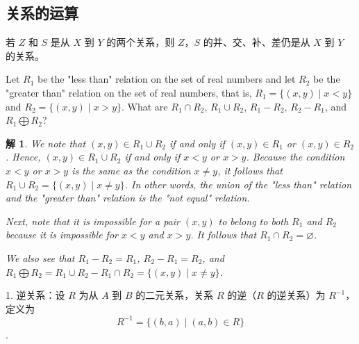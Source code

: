 \documentclass[normal,cyan]{elegantnote}
\newtheorem{solve}{解}
\begin{document}
\subsection{关系的运算}
\begin{theorem}
    若 $Z$ 和 $S$ 是从 $X$ 到 $Y$ 的两个关系，则 $Z$，$S$ 的并、交、补、差仍是从 $X$ 到 $Y$ 的关系。
\end{theorem}
\begin{example}
    Let $R_1$ be the "less than" relation on the set of real numbers and let $R_2$ be the "greater than" relation on the set of real numbers, that is, $R_1 = \{(x, y) \mid x < y\}$ and $R_2 = \{(x, y) \mid x > y\}$. What are $R_1 \cap R_2$, $R_1 \cup R_2$, $R_1 - R_2$, $R_2 - R_1$, and $R_1 \bigoplus R_2$?
\end{example}
\begin{solve}
    We note that $(x, y) \in R_1 \cup R_2$ if and only if $(x, y) \in R_1$ or $(x, y) \in R_2$. Hence, $(x, y) \in R_1 \cup R_2$ if and only if $x < y$ or $x > y$. Because the condition
    $x < y$ or $x > y$ is the same as the condition $x \neq y$, it follows that $R_1 \cup R_2 = \{(x, y) \mid x \neq y\}$. In other words, the union of the "less than" relation and the "greater than" relation is the "not equal" relation.

    Next, note that it is impossible for a pair $(x, y)$ to belong to both $R_1$ and $R_2$ because it is impossible for $x < y$ and $x > y$. It follows that $R_1 \cap R_2 = \varnothing$.

    We also see that $R_1 - R_2 = R_1$, $R_2 - R_1 = R_2$, and $R_1 \bigoplus R_2 = R_1 \cup R_2 - R_1 \cap R_2 = \{(x, y) \mid x \neq y\}$.
\end{solve}
1. 逆关系：设 $R$ 为从 $A$ 到 $B$ 的二元关系，关系 $R$ 的逆（$R$ 的{\color{red}逆关系}）为 $R^{-1}$，定义为 $$R^{-1} = \{(b, a) \mid (a, b) \in R\}$$.
\end{document}
